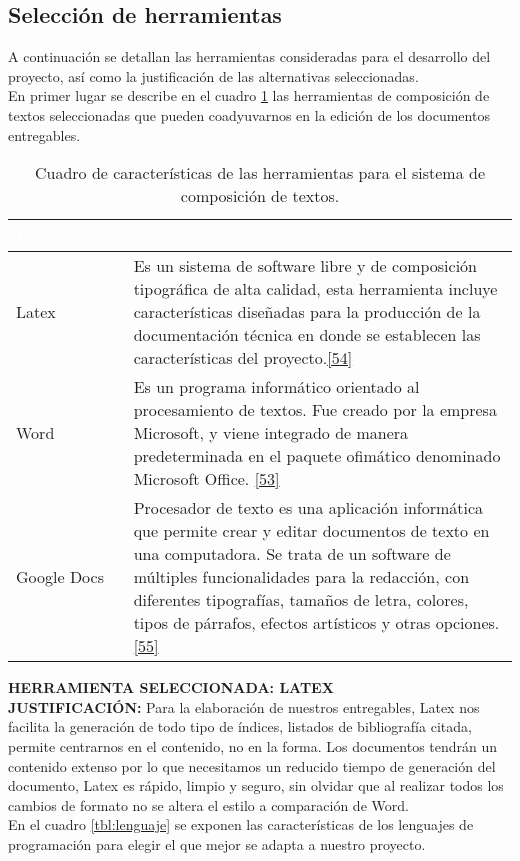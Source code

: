 \subsection{Selección de herramientas}

A continuación se detallan las herramientas consideradas para el desarrollo del proyecto, así como la justificación de las alternativas seleccionadas.\\

En primer lugar se describe en el cuadro \ref{tbl:compotex} las herramientas de composición de textos seleccionadas que pueden coadyuvarnos en la edición de los documentos entregables.

\begin{table}[H]
	\centering
	\begin{tabular}{|p{3cm}|p{12cm}|}
		\hline
		 \rowcolor{black} \textcolor{white}{\textbf{Herramienta}} & \textcolor{white}{\textbf{Características}}  \\ \hline
		Latex & Es un sistema de software libre y de composición tipográfica de alta calidad, esta herramienta incluye características diseñadas para la producción de la documentación técnica en donde se establecen las características del proyecto.\hyperlink{b54}{[54]}\\
		\hline
		Word & Es un programa informático orientado al procesamiento de textos. Fue creado por la empresa Microsoft, y viene integrado de manera predeterminada en el paquete ofimático denominado Microsoft Office. \hyperlink{b53}{[53]}\\
		\hline
		Google Docs & Procesador de texto es una aplicación informática que permite crear y editar documentos de texto en una computadora. Se trata de un software de múltiples funcionalidades para la redacción, con diferentes tipografías, tamaños de letra, colores, tipos de párrafos, efectos artísticos y otras opciones. \hyperlink{b55}{[55]}\\
		\hline
	\end{tabular}
\caption{Cuadro de características de las herramientas para el sistema de composición de textos.}
\label{tbl:compotex}
\end{table}

\textbf {HERRAMIENTA SELECCIONADA: LATEX}\\

\textbf {JUSTIFICACIÓN:} Para la elaboración de nuestros entregables, Latex nos facilita la generación de todo tipo de índices, listados de bibliografía citada, permite centrarnos en el contenido, no en la forma. Los documentos tendrán un contenido extenso por lo que necesitamos un reducido tiempo de generación del documento, Latex es rápido, limpio y seguro, sin olvidar que al realizar todos los cambios de formato no se altera el estilo a comparación de Word.\\
\newpage
En el cuadro \ref{tbl:lenguaje} se exponen las características de los lenguajes de programación para elegir el que mejor se adapta a nuestro proyecto.

